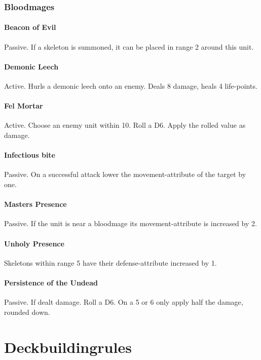 \documentclass[a5paper,pagesize,10pt,bibtotoc,pointlessnumbers,
normalheadings,DIV=9,twoside=false]{scrbook}
\begin{document}
\newpage
\subsection{Bloodmages}

\subsubsection{Beacon of Evil}
Passive. If a skeleton is summoned, it can be placed in range 2 around this unit.

\subsubsection{Demonic Leech}
Active. Hurls a demonic leech onto an enemy. Deals 8 damage, heals 4 life-points.

\subsubsection{Fel Mortar}
Active. Choose an enemy unit within 10. Roll a D6. Apply the rolled value as damage.

\subsubsection{Infectious bite}
Passive. On a successful attack lower the movement-attribute of the target by one.

\subsubsection{Masters Presence}
Passive. If the unit is near a bloodmage its movement-attribute is increased by 2.

\subsubsection{Unholy Presence}
Skeletons within range 5 have their defense-attribute increased by 1.

\subsubsection{Persistence of the Undead}
Passive. If dealt damage. Roll a D6. On a 5 or 6 only apply half the damage, rounded down.



\chapter{Deckbuildingrules}
\end{document}
